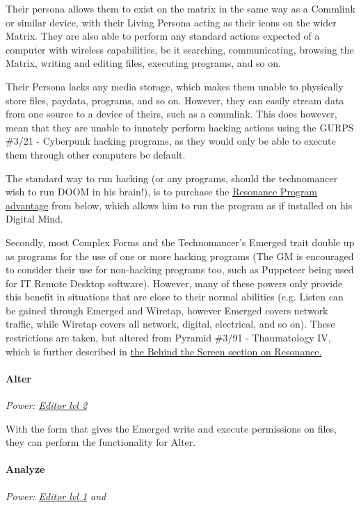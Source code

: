 \begin{multicols*}{3}
	Their persona allows them to exist on the matrix in the same way as a Commlink or similar device, with their Living Persona acting as their icons on the wider Matrix. They are also able to perform any standard actions expected of a computer with wireless capabilities, be it searching, communicating, browsing the Matrix, writing and editing files, executing programs, and so on. 
	
	Their Persona lacks any media storage, which makes them unable to physically store files, paydata, programs, and so on. However, they can easily stream data from one source to a device of theirs, such as a commlink. This does however, mean that they are unable to innately perform hacking actions using the GURPS \#3/21 - Cyberpunk hacking programs, as they would only be able to execute them through other computers be default.
	
	The standard way to run hacking (or any programs, should the technomancer wish to run DOOM in his brain!), is to purchase the \hyperref[resonance_program]{Resonance Program advantage} from below, which allows him to run the program as if installed on his Digital Mind.
	
	Secondly, most Complex Forms and the Technomancer's Emerged trait double up as programs for the use of one or more hacking programs (The GM is encouraged to consider their use for non-hacking programs too, such as Puppeteer being used for IT Remote Desktop software). However, many of these powers only provide this benefit in situations that are close to their normal abilities (e.g. Listen can be gained through Emerged and Wiretap, however Emerged covers network traffic, while Wiretap covers all network, digital, electrical, and so on). These restrictions are taken, but altered from Pyramid \#3/91 - Thaumatology IV, which is further described in \hyperref[behind_the_screen]{the Behind the Screen section on Resonance.}
	
	\paragraph{Alter}
	\begin{center}
		\textit{Power: \hyperref[editor]{Editor lvl 2}}
	\end{center}

	With the form that gives the Emerged write and execute permissions on files, they can perform the functionality for Alter.

	\paragraph{Analyze}
	\begin{center}
		\textit{Power: \hyperref[editor]{Editor lvl 1} and }
	\end{center}


\end{multicols*}
